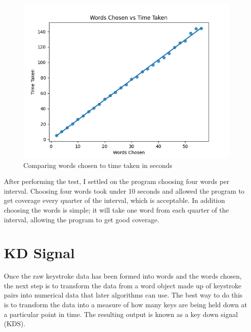 \documentclass[10pt,a4paper]{report}
\begin{document}
\begin{figure}
	\centering
	\includegraphics[scale=0.70]{WordsChosenVsTime}
	\caption{Comparing words chosen to time taken in seconds}
	\label{fig:WordsvsTime}
\end{figure}

After performing the test, I settled on the program choosing four words per interval. Choosing four words took under 10 seconds and allowed the program to get coverage every quarter of the interval, which is acceptable. In addition choosing the words is simple; it will take one word from each quarter of the interval, allowing the program to get good coverage.

\section{KD Signal}
Once the raw keystroke data has been formed into words and the words chosen, the next step is to transform the data from a word object made up of keystroke pairs into numerical data that later algorithms can use. The best way to do this is to transform the data into a measure of how many keys are being held down at a particular point in time. The resulting output is known as a key down signal (KDS). \cite{ToosiRamin2021Taok}
\end{document}
